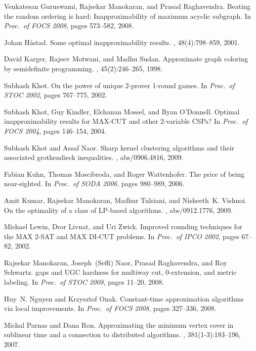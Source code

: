\documentclass[letterpaper, 11pt]{article}
\begin{document}
\begin{thebibliography}{10}
Venkatesan Guruswami, Rajsekar Manokaran, and Prasad Raghavendra.
\newblock Beating the random ordering is hard: Inapproximability of maximum
  acyclic subgraph.
\newblock In {\em Proc.~of FOCS 2008}, pages 573--582, 2008.

Johan H{\aa}stad.
\newblock Some optimal inapproximability results.
, 48(4):798--859, 2001.

David Karger, Rajeev Motwani, and Madhu Sudan.
\newblock Approximate graph coloring by semidefinite programming.
, 45(2):246--265, 1998.

Subhash Khot.
\newblock On the power of unique 2-prover 1-round games.
\newblock In {\em Proc.~of STOC 2002}, pages 767--775, 2002.

Subhash Khot, Guy Kindler, Elchanan Mossel, and Ryan O'Donnell.
\newblock Optimal inapproximability results for {MAX}-{CUT} and other
  2-variable {CSPs}?
\newblock In {\em Proc.~of FOCS 2004}, pages 146--154, 2004.

Subhash Khot and Assaf Naor.
\newblock Sharp kernel clustering algorithms and their associated grothendieck
  inequalities.
, abs/0906.4816, 2009.

Fabian Kuhn, Thomas Moscibroda, and Roger Wattenhofer.
\newblock The price of being near-sighted.
\newblock In {\em Proc.~of SODA 2006}, pages 980--989, 2006.

Amit Kumar, Rajsekar Manokaran, Madhur Tulsiani, and Nisheeth~K. Vishnoi.
\newblock On the optimality of a class of {LP}-based algorithms.
, abs/0912.1776, 2009.

Michael Lewin, Dror Livnat, and Uri Zwick.
\newblock Improved rounding techniques for the {MAX} 2-{SAT} and {MAX}
  {DI}-{CUT} problems.
\newblock In {\em Proc.~of IPCO 2002}, pages 67--82, 2002.

Rajsekar Manokaran, Joseph~(Seffi) Naor, Prasad Raghavendra, and Roy Schwartz.
 gaps and {UGC} hardness for multiway cut, 0-extension, and
  metric labeling.
\newblock In {\em Proc.~of STOC 2008}, pages 11--20, 2008.

Huy~N. Nguyen and Krzysztof Onak.
\newblock Constant-time approximation algorithms via local improvements.
\newblock In {\em Proc.~of FOCS 2008}, pages 327--336, 2008.

Michal Parnas and Dana Ron.
\newblock Approximating the minimum vertex cover in sublinear time and a
  connection to distributed algorithms.
, 381(1-3):183--196, 2007.


\end{thebibliography}
\end{document}
